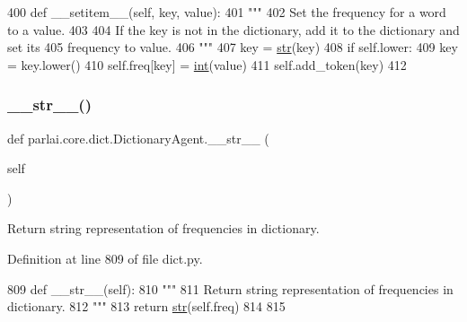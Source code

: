 \begin{DoxyCode}
400     \textcolor{keyword}{def }\_\_setitem\_\_(self, key, value):
401         \textcolor{stringliteral}{"""}
402 \textcolor{stringliteral}{        Set the frequency for a word to a value.}
403 \textcolor{stringliteral}{}
404 \textcolor{stringliteral}{        If the key is not in the dictionary, add it to the dictionary and set its}
405 \textcolor{stringliteral}{        frequency to value.}
406 \textcolor{stringliteral}{        """}
407         key = \hyperlink{namespacegenerate__task__READMEs_a5b88452ffb87b78c8c85ececebafc09f}{str}(key)
408         \textcolor{keywordflow}{if} self.lower:
409             key = key.lower()
410         self.freq[key] = \hyperlink{namespacelanguage__model_1_1eval__ppl_a7d12ee00479673c5c8d1f6d01faa272a}{int}(value)
411         self.add\_token(key)
412 
\end{DoxyCode}
\mbox{\label{classparlai_1_1core_1_1dict_1_1DictionaryAgent_a4b822841903bedb2b0f866e7bd17f3fa}} 
\subsubsection{\texorpdfstring{\+\_\+\+\_\+str\+\_\+\+\_\+()}{\_\_str\_\_()}}
{\footnotesize\ttfamily def parlai.\+core.\+dict.\+Dictionary\+Agent.\+\_\+\+\_\+str\+\_\+\+\_\+ (\begin{DoxyParamCaption}\item[{}]{self }\end{DoxyParamCaption})}

\begin{DoxyVerb}Return string representation of frequencies in dictionary.
\end{DoxyVerb}
 

Definition at line 809 of file dict.\+py.


\begin{DoxyCode}
809     \textcolor{keyword}{def }\_\_str\_\_(self):
810         \textcolor{stringliteral}{"""}
811 \textcolor{stringliteral}{        Return string representation of frequencies in dictionary.}
812 \textcolor{stringliteral}{        """}
813         \textcolor{keywordflow}{return} \hyperlink{namespacegenerate__task__READMEs_a5b88452ffb87b78c8c85ececebafc09f}{str}(self.freq)
814 
815 
\end{DoxyCode}
\mbox{\label{classparlai_1_1core_1_1dict_1_1DictionaryAgent_af34b92857b41748aafdecee34ebf9345}} 
